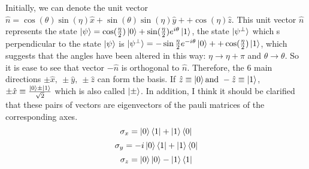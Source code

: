\documentclass[english,14pt,a4paper]{article}
\begin{document}
	Initially, we can denote the unit vector $\hat{n} = \cos(\theta)\sin(\eta) \hat{x} + \sin(\theta)\sin(\eta)\hat{y} + +\cos(\eta)\hat{z}$. This unit vector $\hat{n}$ represents the state $\ket{\psi} = \cos(\frac{\eta }{2})\ket{0} + \sin(\frac{\eta}{2}) e^{i\theta}\ket{1}$, the state $\ket{\psi^{\perp}}$ which s perpendicular to the state $\ket{\psi}$ is $\ket{\psi^{\perp}} = -\sin{\frac{\eta}{2}}e^{-i\theta} \ket{0} ++ \cos(\frac{\eta}{2})\ket{1}$, which suggests that the angles have been altered in this way: $ \eta \rightarrow \eta + \pi $ and $ \theta \rightarrow \theta$. So it is ease to see that vector $-\hat{n}$ is orthogonal to $\hat{n}$. Therefore, the 6 main directions $\pm \hat{x}, \ \pm \hat{y}, \ \pm \hat{z}$ can form the basis. If $\hat{z} \equiv \ket{0} \text{and} \ -\hat{z} \equiv \ket{1}$, $\pm \hat{x} \equiv \frac{\ket{0} \pm \ket{1}}{\sqrt{2}}$ which is also called $\ket{\pm}$. In addition, I think it should be clarified that these pairs of vectors are eigenvectors of the pauli matrices of the corresponding axes. 
	\[
	\sigma_x = \ket{0}\bra{1} + \ket{1}\bra{0}
	\]
	\[
	\sigma_y = -i\ket{0}\bra{1} + \ket{1}\bra{0}
	\]
	\[
	\sigma_z = \ket{0}\ket{0} - \ket{1}\bra{1}
	\]
	
\end{document}
